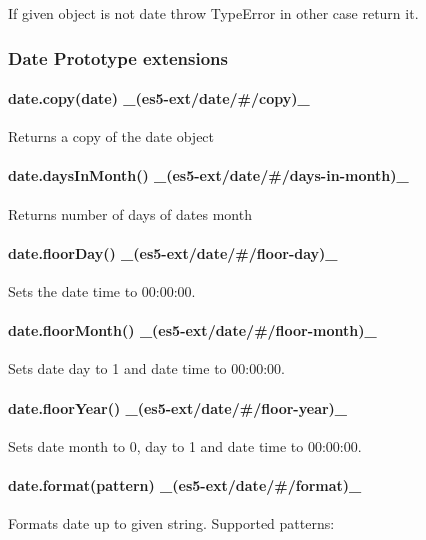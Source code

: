 If given object is not date throw Type\+Error in other case return it.

\subsubsection*{Date Prototype extensions}

\paragraph*{date.\+copy(date) \+\_\+(es5-\/ext/date/\#/copy)\+\_\+}

Returns a copy of the date object

\paragraph*{date.\+days\+In\+Month() \+\_\+(es5-\/ext/date/\#/days-\/in-\/month)\+\_\+}

Returns number of days of date\textquotesingle{}s month

\paragraph*{date.\+floor\+Day() \+\_\+(es5-\/ext/date/\#/floor-\/day)\+\_\+}

Sets the date time to 00\+:00\+:00.

\paragraph*{date.\+floor\+Month() \+\_\+(es5-\/ext/date/\#/floor-\/month)\+\_\+}

Sets date day to 1 and date time to 00\+:00\+:00.

\paragraph*{date.\+floor\+Year() \+\_\+(es5-\/ext/date/\#/floor-\/year)\+\_\+}

Sets date month to 0, day to 1 and date time to 00\+:00\+:00.

\paragraph*{date.\+format(pattern) \+\_\+(es5-\/ext/date/\#/format)\+\_\+}

Formats date up to given string. Supported patterns\+:


